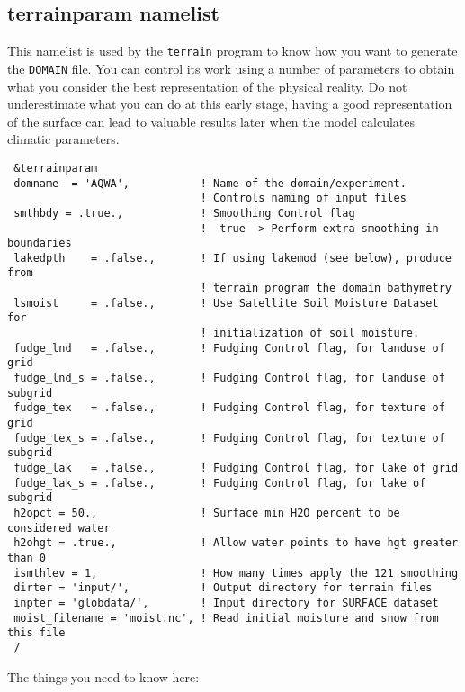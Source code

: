 \subsection{terrainparam namelist}
\label{terparam}
This namelist is used by the \verb=terrain= program to know how you want
to generate the \verb=DOMAIN= file. You can control its work using a number of
parameters to obtain what you consider the best representation of the
physical reality. Do not underestimate what you can do at this early stage,
having a good representation of the surface can lead to valuable results
later when the model calculates climatic parameters.

{\footnotesize
\begin{Verbatim}
 &terrainparam
 domname  = 'AQWA',           ! Name of the domain/experiment.
                              ! Controls naming of input files
 smthbdy = .true.,            ! Smoothing Control flag
                              !  true -> Perform extra smoothing in boundaries
 lakedpth    = .false.,       ! If using lakemod (see below), produce from
                              ! terrain program the domain bathymetry
 lsmoist     = .false.,       ! Use Satellite Soil Moisture Dataset for
                              ! initialization of soil moisture.
 fudge_lnd   = .false.,       ! Fudging Control flag, for landuse of grid 
 fudge_lnd_s = .false.,       ! Fudging Control flag, for landuse of subgrid
 fudge_tex   = .false.,       ! Fudging Control flag, for texture of grid
 fudge_tex_s = .false.,       ! Fudging Control flag, for texture of subgrid
 fudge_lak   = .false.,       ! Fudging Control flag, for lake of grid
 fudge_lak_s = .false.,       ! Fudging Control flag, for lake of subgrid
 h2opct = 50.,                ! Surface min H2O percent to be considered water
 h2ohgt = .true.,             ! Allow water points to have hgt greater than 0
 ismthlev = 1,                ! How many times apply the 121 smoothing
 dirter = 'input/',           ! Output directory for terrain files
 inpter = 'globdata/',        ! Input directory for SURFACE dataset
 moist_filename = 'moist.nc', ! Read initial moisture and snow from this file
 /
\end{Verbatim}
}

The things you need to know here:

